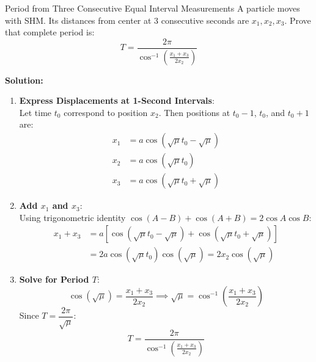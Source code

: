 \begin{examplebox}{Period from Three Consecutive Equal Interval Measurements}
A particle moves with SHM. Its distances from center at 3 consecutive seconds are $x_1, x_2, x_3$. Prove that complete period is:
\begin{equation*}
    T = \frac{2\pi}{\cos^{-1}\left( \frac{x_1 + x_3}{2 x_2} \right)}
\end{equation*}

\tcblower
\textbf{Solution:}

\begin{enumerate}[leftmargin=1.5em]
    \item \textbf{Express Displacements at 1-Second Intervals}:\\
    Let time $t_0$ correspond to position $x_2$. Then positions at $t_0 - 1$, $t_0$, and $t_0 + 1$ are:
    \begin{align*}
        x_1 &= a \cos(\sqrt{\mu} t_0 - \sqrt{\mu}) \\
        x_2 &= a \cos(\sqrt{\mu} t_0) \\
        x_3 &= a \cos(\sqrt{\mu} t_0 + \sqrt{\mu})
    \end{align*}

    \item \textbf{Add $x_1$ and $x_3$}:\\
    Using trigonometric identity $\cos(A-B) + \cos(A+B) = 2\cos A \cos B$:
    \begin{align*}
        x_1 + x_3 &= a \left[ \cos(\sqrt{\mu} t_0 - \sqrt{\mu}) + \cos(\sqrt{\mu} t_0 + \sqrt{\mu}) \right] \\
        &= 2 a \cos(\sqrt{\mu} t_0) \cos(\sqrt{\mu}) = 2 x_2 \cos(\sqrt{\mu})
    \end{align*}

    \item \textbf{Solve for Period $T$}:\\
    \begin{equation*}
        \cos(\sqrt{\mu}) = \frac{x_1 + x_3}{2 x_2} \implies \sqrt{\mu} = \cos^{-1}\left(\frac{x_1 + x_3}{2 x_2}\right)
    \end{equation*}
    Since $T = \dfrac{2\pi}{\sqrt{\mu}}$:
    \begin{equation*}
        T = \frac{2\pi}{\cos^{-1}\left(\frac{x_1 + x_3}{2 x_2}\right)}
    \end{equation*}
\end{enumerate}
\end{examplebox}
